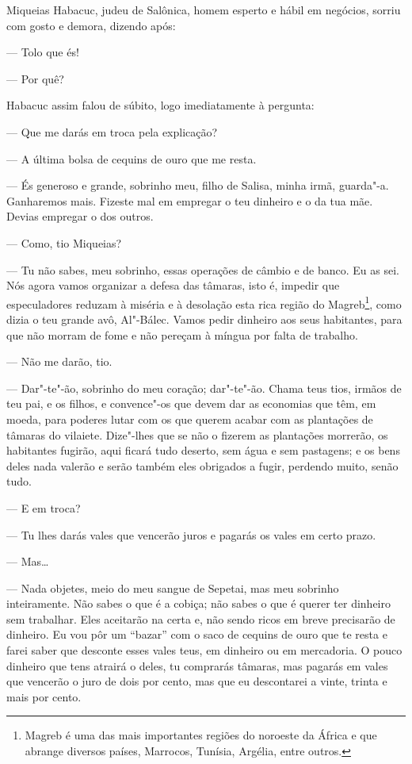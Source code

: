Miqueias Habacuc, judeu de Salônica, homem esperto e hábil em negócios,
sorriu com gosto e demora, dizendo após:

--- Tolo que és!

--- Por quê?

Habacuc assim falou de súbito, logo imediatamente à pergunta:

--- Que me darás em troca pela explicação?

--- A última bolsa de cequins de ouro que me resta.

--- És generoso e grande, sobrinho meu, filho de Salisa, minha irmã,
guarda"-a. Ganharemos mais. Fizeste mal em empregar o teu dinheiro e o da
tua mãe. Devias empregar o dos outros.

--- Como, tio Miqueias?

--- Tu não sabes, meu sobrinho, essas operações de câmbio e de banco. Eu
as sei. Nós agora vamos organizar a defesa das tâmaras, isto é, impedir
que especuladores reduzam à miséria e à desolação esta rica região do
Magreb\footnote{Magreb é uma das mais importantes regiões do noroeste da
  África e que abrange diversos países, Marrocos, Tunísia, Argélia,
  entre outros.}, como dizia o teu grande avô, Al"-Bálec. Vamos pedir
dinheiro aos seus habitantes, para que não morram de fome e não pereçam
à míngua por falta de trabalho.

--- Não me darão, tio.

--- Dar"-te"-ão, sobrinho do meu coração; dar"-te"-ão. Chama teus tios,
irmãos de teu pai, e os filhos, e convence"-os que devem dar as economias
que têm, em moeda, para poderes lutar com os que querem acabar com as
plantações de tâmaras do vilaiete. Dize"-lhes que se não o fizerem as
plantações morrerão, os habitantes fugirão, aqui ficará tudo deserto,
sem água e sem pastagens; e os bens deles nada valerão e serão também
eles obrigados a fugir, perdendo muito, senão tudo.

--- E em troca?

--- Tu lhes darás vales que vencerão juros e pagarás os vales em certo
prazo.

--- Mas\ldots{}

--- Nada objetes, meio do meu sangue de Sepetai, mas meu sobrinho
inteiramente. Não sabes o que é a cobiça; não sabes o que é querer ter
dinheiro sem trabalhar. Eles aceitarão na certa e, não sendo ricos em
breve precisarão de dinheiro. Eu vou pôr um ``bazar'' com o saco de
cequins de ouro que te resta e farei saber que desconte esses vales
teus, em dinheiro ou em mercadoria. O pouco dinheiro que tens atrairá o
deles, tu comprarás tâmaras, mas pagarás em vales que vencerão o juro de
dois por cento, mas que eu descontarei a vinte, trinta e mais por cento.

